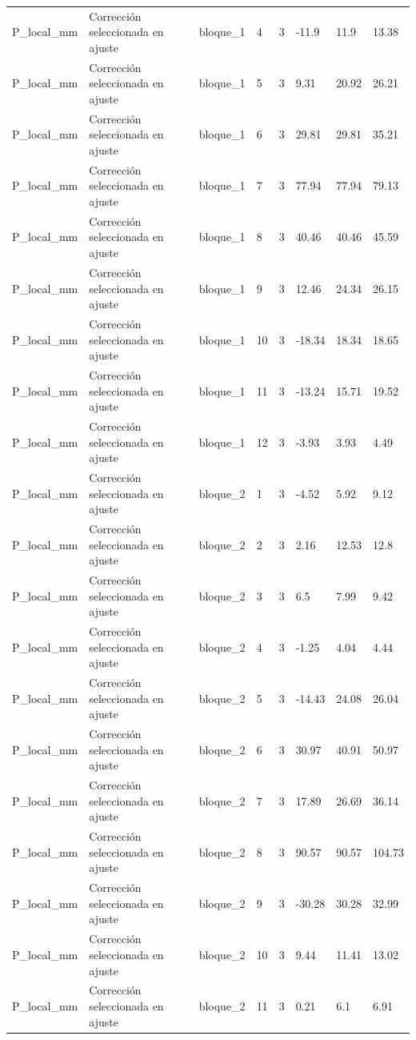 \begin{longtable}{llllllll}
P\_local\_mm & Corrección seleccionada en ajuste & bloque\_1 & 4 & 3 & -11.9 & 11.9 & 13.38 \\
P\_local\_mm & Corrección seleccionada en ajuste & bloque\_1 & 5 & 3 & 9.31 & 20.92 & 26.21 \\
P\_local\_mm & Corrección seleccionada en ajuste & bloque\_1 & 6 & 3 & 29.81 & 29.81 & 35.21 \\
P\_local\_mm & Corrección seleccionada en ajuste & bloque\_1 & 7 & 3 & 77.94 & 77.94 & 79.13 \\
P\_local\_mm & Corrección seleccionada en ajuste & bloque\_1 & 8 & 3 & 40.46 & 40.46 & 45.59 \\
P\_local\_mm & Corrección seleccionada en ajuste & bloque\_1 & 9 & 3 & 12.46 & 24.34 & 26.15 \\
P\_local\_mm & Corrección seleccionada en ajuste & bloque\_1 & 10 & 3 & -18.34 & 18.34 & 18.65 \\
P\_local\_mm & Corrección seleccionada en ajuste & bloque\_1 & 11 & 3 & -13.24 & 15.71 & 19.52 \\
P\_local\_mm & Corrección seleccionada en ajuste & bloque\_1 & 12 & 3 & -3.93 & 3.93 & 4.49 \\
P\_local\_mm & Corrección seleccionada en ajuste & bloque\_2 & 1 & 3 & -4.52 & 5.92 & 9.12 \\
P\_local\_mm & Corrección seleccionada en ajuste & bloque\_2 & 2 & 3 & 2.16 & 12.53 & 12.8 \\
P\_local\_mm & Corrección seleccionada en ajuste & bloque\_2 & 3 & 3 & 6.5 & 7.99 & 9.42 \\
P\_local\_mm & Corrección seleccionada en ajuste & bloque\_2 & 4 & 3 & -1.25 & 4.04 & 4.44 \\
P\_local\_mm & Corrección seleccionada en ajuste & bloque\_2 & 5 & 3 & -14.43 & 24.08 & 26.04 \\
P\_local\_mm & Corrección seleccionada en ajuste & bloque\_2 & 6 & 3 & 30.97 & 40.91 & 50.97 \\
P\_local\_mm & Corrección seleccionada en ajuste & bloque\_2 & 7 & 3 & 17.89 & 26.69 & 36.14 \\
P\_local\_mm & Corrección seleccionada en ajuste & bloque\_2 & 8 & 3 & 90.57 & 90.57 & 104.73 \\
P\_local\_mm & Corrección seleccionada en ajuste & bloque\_2 & 9 & 3 & -30.28 & 30.28 & 32.99 \\
P\_local\_mm & Corrección seleccionada en ajuste & bloque\_2 & 10 & 3 & 9.44 & 11.41 & 13.02 \\
P\_local\_mm & Corrección seleccionada en ajuste & bloque\_2 & 11 & 3 & 0.21 & 6.1 & 6.91 \\

\end{longtable}
